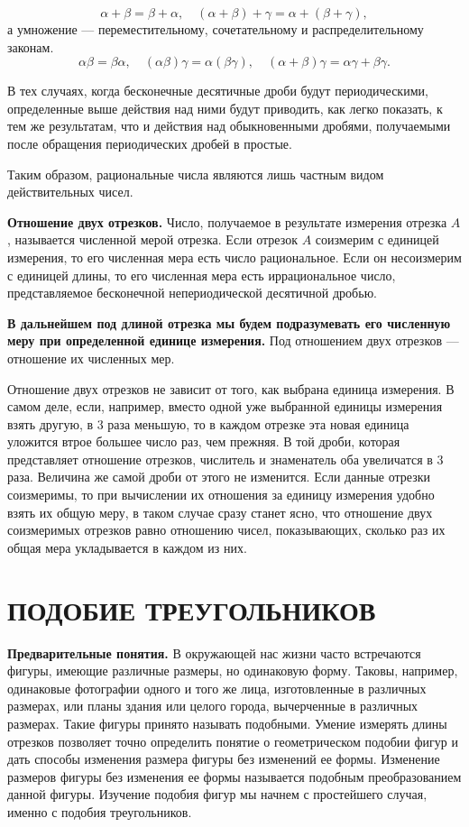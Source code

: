 \documentclass[oneside]{book}
\begin{document}
\[\alpha+\beta=\beta+\alpha,
\quad
(\alpha+\beta)+\gamma=\alpha+(\beta+\gamma),
\]
а умножение — переместительному, сочетательному и распределительному законам.
\[\alpha\beta=\beta\alpha,
\quad
(\alpha\beta)\gamma=\alpha(\beta\gamma),
\quad
(\alpha+\beta)\gamma=\alpha\gamma+\beta\gamma.
\]

В тех случаях, когда бесконечные десятичные дроби будут периодическими, определенные выше действия над ними будут приводить, как легко показать, к тем же результатам, что и действия над обыкновенными дробями, получаемыми после обращения периодических дробей в простые.

Таким образом, рациональные числа являются лишь частным видом действительных чисел.

\textbf{Отношение двух отрезков.}
Число, получаемое в результате измерения отрезка $A$, называется численной мерой отрезка.
Если отрезок $A$ соизмерим с единицей измерения, то его численная мера есть число рациональное.
Если он несоизмерим с единицей длины, то его численная мера есть иррациональное число, представляемое бесконечной непериодической десятичной дробью.

\textbf{В дальнейшем под длиной отрезка мы будем подразумевать его численную меру при определенной единице измерения.}
Под отношением двух отрезков — отношение их численных мер.

Отношение двух отрезков не зависит от того, как выбрана единица измерения.
В самом деле, если, например, вместо одной уже выбранной единицы измерения взять другую, в 3 раза меньшую, то в каждом отрезке эта новая единица уложится втрое большее число раз, чем прежняя.
В той дроби, которая представляет отношение отрезков, числитель и знаменатель оба увеличатся в 3 раза.
Величина же самой дроби от этого не изменится.
Если данные отрезки соизмеримы, то при вычислении их отношения за единицу измерения удобно взять их общую меру, в таком случае сразу станет ясно, что отношение двух соизмеримых отрезков равно отношению чисел, показывающих, сколько раз их общая мера укладывается в каждом из них.

\section{ПОДОБИЕ ТРЕУГОЛЬНИКОВ}

\textbf{Предварительные понятия.}
В окружающей нас жизни часто встречаются фигуры, имеющие различные размеры, но одинаковую форму.
Таковы, например, одинаковые фотографии одного и того же лица, изготовленные в различных размерах, или планы здания или целого города, вычерченные в различных размерах. %
Такие фигуры принято называть подобными.
Умение измерять длины отрезков позволяет точно определить понятие о геометрическом подобии фигур и дать способы изменения размера фигуры без изменений ее формы.
Изменение размеров фигуры без изменения ее формы называется подобным преобразованием данной фигуры.
Изучение подобия фигур мы начнем с простейшего случая, именно с подобия треугольников.
\end{document}
